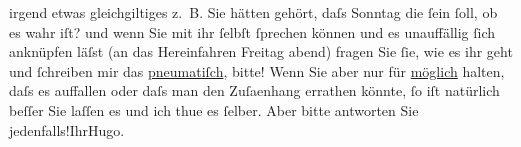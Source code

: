                irgend etwas gleichgiltiges z. B. Sie hätten gehört, daſs Sonntag die
                  \label{K_L00644_2v}\label{K_L00644_2h}{ }ſein ſoll, ob es wahr iſt?\pend
           \pstart
           und wenn Sie mit ihr ſelbſt ſprechen können und es unauffällig ſich anknüpfen läſst
               (an das Hereinfahren Freitag{ }abend) fragen Sie ſie, wie es ihr geht und ſchreiben mir das \uline{pneumatiſch}, bitte! Wenn Sie aber nur für \uline{möglich} halten, daſs es auffallen oder daſs man den Zuſa{\geminationm}enhang errathen könnte, ſo iſt natürlich beſſer Sie
               laſſen es und ich thue es ſelber. Aber bitte antworten Sie jedenfalls!\hspace*{3.5em}Ihr\spacefill\mbox{Hugo.}\pend
           \endnumbering{}  
      